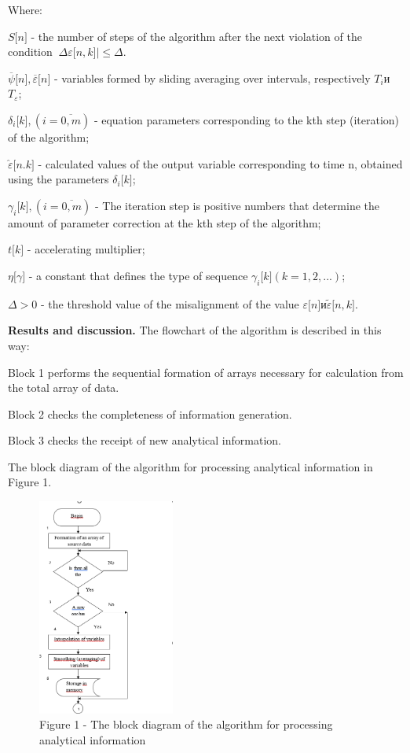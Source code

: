 Where:

\(S\lbrack n\rbrack\) - the number of steps of the algorithm after the
next violation of the condition
\(\left. \ \Delta\varepsilon\lbrack n,k\rbrack \right| \leq \Delta\).

\(\overline{\psi}\lbrack n\rbrack,\overline{\varepsilon}\lbrack n\rbrack\)
- variables formed by sliding averaging over intervals, respectively
\(T_{i}\)и \(T_{\varepsilon}\);

\(\delta_{i}\lbrack k\rbrack,(i = \overline{0,m})\) - equation
parameters corresponding to the kth step (iteration) of the algorithm;

\(\overset{̑}{\varepsilon}\lbrack n.k\rbrack\) - calculated values of the
output variable corresponding to time n, obtained using the parameters
\(\delta_{i}\lbrack k\rbrack\);

\(\gamma_{i}\lbrack k\rbrack,(i = \overline{0,m})\) - The iteration step
is positive numbers that determine the amount of parameter correction at
the kth step of the algorithm;

\(t\lbrack k\rbrack\) - accelerating multiplier;

\(\eta\lbrack\gamma\rbrack\) - a constant that defines the type of
sequence \(\gamma_{i}\lbrack k\rbrack(k = 1,2,...)\);

\(\Delta > 0\) - the threshold value of the misalignment of the value
\(\varepsilon\lbrack n\rbrack и\widetilde{\varepsilon}\lbrack n,k\rbrack\).

{\bfseries Results and discussion.} The flowchart of the algorithm is
described in this way:

Block 1 performs the sequential formation of arrays necessary for
calculation from the total array of data.

Block 2 checks the completeness of information generation.

Block 3 checks the receipt of new analytical information.

The block diagram of the algorithm for processing analytical information
in Figure 1.

\begin{figure}[H]
	\centering
	\includegraphics[width=0.4\textwidth]{assets/7}
	\caption*{Figure 1 - The block diagram of the algorithm for processing analytical information}
\end{figure}

